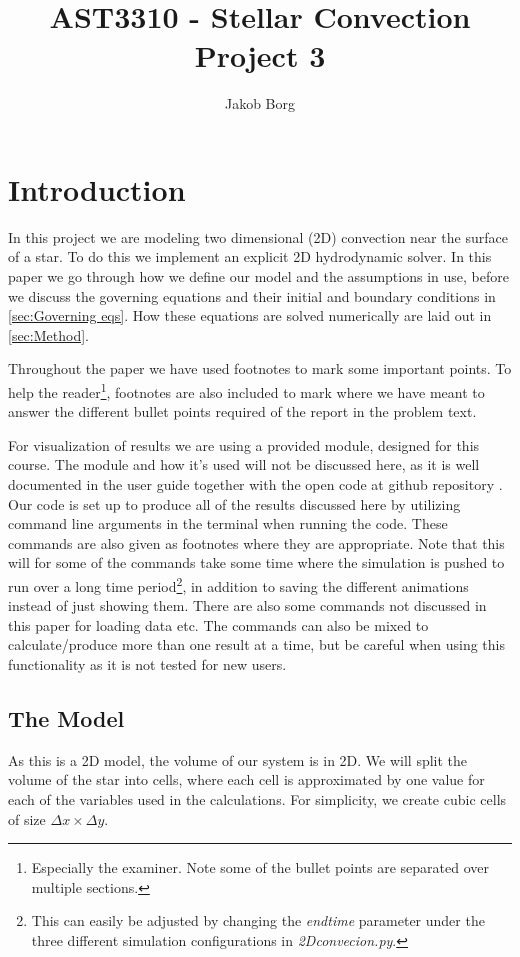 \documentclass[11pt,a4paper,twocolumn,titlepage]{article}
\title{AST3310 - Stellar Convection\\ 
\vspace{15mm}Project 3}
\author{Jakob Borg}
\begin{document}
\maketitle

\section{Introduction}\label{sec:Intro}
In this project we are modeling two dimensional (2D) convection near the surface of a star. To do this we implement an explicit 2D hydrodynamic solver. In this paper we go through how we define our model and the assumptions in use, before we discuss the governing equations and their initial and boundary conditions in \cref{sec:Governing eqs}. How these equations are solved numerically are laid out in \cref{sec:Method}.

Throughout the paper we have used footnotes to mark some important points. To help the reader\footnote{Especially the examiner. Note some of the bullet points are separated over multiple sections.}, footnotes are also included to mark where we have meant to answer the different bullet points required of the report in the problem text.

For visualization of results we are using a provided module, designed for this course. The module and how it's used will not be discussed here, as it is well documented in the user guide together with the open code at github repository \cite{user_guide}. Our code is set up to produce all of the results discussed here by utilizing command line arguments in the terminal when running the code. These commands are also given as footnotes where they are appropriate. Note that this will for some of the commands take some time where the simulation is pushed to run over a long time period\footnote{This can easily be adjusted by changing the \textit{endtime} parameter under the three different simulation configurations in \textit{2Dconvecion.py}.}, in addition to saving the different animations instead of just showing them. There are also some commands not discussed in this paper for loading data etc. The commands can also be mixed to calculate/produce more than one result at a time, but be careful when using this functionality as it is not tested for new users.

\subsection{The Model}\label{subsec:Intro/Model}
As this is a 2D model, the volume of our system is in 2D. We will split the volume of the star into cells, where each cell is approximated by one value for each of the variables used in the calculations. For simplicity, we create cubic cells of size $\Delta x \times \Delta y$.
\end{document}
